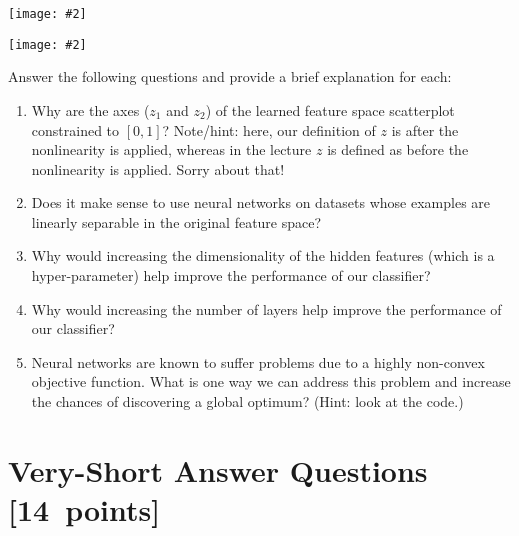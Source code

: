 \documentclass{article}
\newcommand{\blu}[1]{{\textcolor{blu}{#1}}}
\let\ask\blu
\newcommand\pts[1]{\textcolor{pointscolour}{[#1~points]}}
\newcommand{\centerfig}[2]{\begin{center}\texttt{[image: \#2]}\end{center}}
\begin{document}
\centerfig{.7}{./figs/sinusoids_decision_boundary_[2, 2]_2.png}
\centerfig{.7}{./figs/sinusoids_linear_boundary_[2, 2]_2.png}

\ask{Answer the following questions and provide a brief explanation for each:}

\begin{enumerate}
	\item Why are the axes ($z_1$ and $z_2$) of the learned feature space scatterplot constrained to $[0, 1]$? Note/hint: here, our definition of $z$ is after the nonlinearity is applied, whereas in the lecture $z$ is defined as before the nonlinearity is applied. Sorry about that!
	\item Does it make sense to use neural networks on datasets whose examples are linearly separable in the original feature space?
	\item Why would increasing the dimensionality of the hidden features (which is a hyper-parameter) help improve the performance of our classifier?
	\item Why would increasing the number of layers help improve the performance of our classifier?
	\item Neural networks are known to suffer problems due to a highly non-convex objective function. What is one way we can address this problem and increase the chances of discovering a global optimum? (Hint: look at the code.)
\end{enumerate}


\section{Very-Short Answer Questions \pts{14}}
\end{document}
